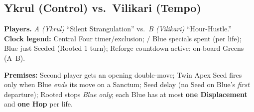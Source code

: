 \subsection*{Ykrul (Control) vs.\ Vilikari (Tempo)}

\noindent\textbf{Players.} \textit{A (Ykrul)} “Silent Strangulation” vs.\ \textit{B (Vilikari)} “Hour-Hustle.”\\
\textbf{Clock legend:}  Central Four timer/exclusion;\; / Blue specials spent (per life);\; \RoC{} Blue just Seeded (Rooted 1 turn);\; \RC{} Reforge countdown active;\;  on-board Greens (A–B).

\medskip
\noindent\textbf{Premises:} Second player gets an opening double-move; Twin Apex Seed fires only when Blue \emph{ends} its move on a Sanctum; Seed delay (no Seed on Blue’s \emph{first} departure); Rooted stops \emph{Blue only}; each Blue has at most \textbf{one Displacement} and \textbf{one Hop} per life.

\bigskip

